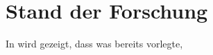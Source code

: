 \section{Stand der Forschung}
In \textcite{Ernst2009} wird gezeigt, dass was \textcite{Bertsekas2005} bereits vorlegte, \lipsum[2-4]
